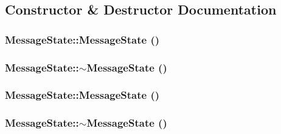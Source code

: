 \subsection{Constructor \& Destructor Documentation}
\hypertarget{classMessageState_ad9003377a5ab63ece9eedd35bae105e}{
\subsubsection[{MessageState}]{\setlength{\rightskip}{0pt plus 5cm}MessageState::MessageState ()}}
\label{classMessageState_ad9003377a5ab63ece9eedd35bae105e}


\hypertarget{classMessageState_5ad0eb922535da32b91d990e64843ec2}{
\subsubsection[{$\sim$MessageState}]{\setlength{\rightskip}{0pt plus 5cm}MessageState::$\sim$MessageState ()}}
\label{classMessageState_5ad0eb922535da32b91d990e64843ec2}


\hypertarget{classMessageState_ad9003377a5ab63ece9eedd35bae105e}{
\subsubsection[{MessageState}]{\setlength{\rightskip}{0pt plus 5cm}MessageState::MessageState ()}}
\label{classMessageState_ad9003377a5ab63ece9eedd35bae105e}


\hypertarget{classMessageState_5ad0eb922535da32b91d990e64843ec2}{
\subsubsection[{$\sim$MessageState}]{\setlength{\rightskip}{0pt plus 5cm}MessageState::$\sim$MessageState ()}}
\label{classMessageState_5ad0eb922535da32b91d990e64843ec2}


